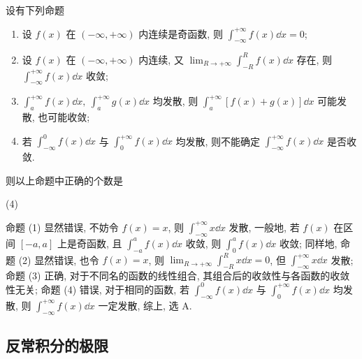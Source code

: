 \begin{example}
    设有下列命题
    \begin{enumerate}[label=(\arabic{*})]
        \item 设 $ f(x) $ 在 $ (-\infty,+\infty) $ 内连续是奇函数, 则 $\displaystyle  \int_{-\infty}^{+\infty} f(x) \dd x=0 $;
        \item 设 $ f(x) $ 在 $ (-\infty,+\infty) $ 内连续, 又 $\displaystyle \lim _{R \rightarrow+\infty} \int_{-R}^{R} f(x) \dd x $ 存在, 则 $\displaystyle \int_{-\infty}^{+\infty} f(x) \dd x $ 收敛;
        \item $\displaystyle \int_{a}^{+\infty} f(x) \dd x,~ \int_{a}^{+\infty} g(x) \dd x $ 均发散, 则 $\displaystyle  \int_{a}^{+\infty}[f(x)+g(x)] \dd x $ 可能发散, 也可能收敛;
        \item 若 $ \displaystyle \int_{-\infty}^{0} f(x) \dd x $ 与 $\displaystyle  \int_{0}^{+\infty} f(x) \dd x $ 均发散, 则不能确定 $\displaystyle \int_{-\infty}^{+\infty} f(x) \dd x $ 是否收敛.
    \end{enumerate}
    则以上命题中正确的个数是
    \begin{tasks}(4)
    \end{tasks}
\end{example}
\begin{solution}
    命题 (1) 显然错误, 不妨令 $f(x)=x$, 则 $\displaystyle\int_{-\infty}^{+\infty}x\dd x$ 发散, 一般地, 若 $f(x)$ 在区间 $[-a,a]$ 上是奇函数, 且 $\displaystyle\int_{-a}^{a}f(x)\dd x$ 收敛, 则 $\displaystyle\int_{0}^{a}f(x)\dd x$ 收敛;
    同样地, 命题 (2) 显然错误, 也令 $f(x)=x$, 则 $\displaystyle\lim_{R\to+\infty}\int_{-R}^{R}x\dd x=0$, 但 $\displaystyle\int_{-\infty}^{+\infty}x\dd x$ 发散;
    命题 (3) 正确, 对于不同名的函数的线性组合, 其组合后的收敛性与各函数的收敛性无关; 命题 (4) 错误, 对于相同的函数, 若 $ \displaystyle \int_{-\infty}^{0} f(x) \dd x $ 与 $\displaystyle  \int_{0}^{+\infty} f(x) \dd x $ 均发散, 
    则 $\displaystyle \int_{-\infty}^{+\infty} f(x) \dd x $ 一定发散, 综上, 选 A.
\end{solution}

\subsection{反常积分的极限}

